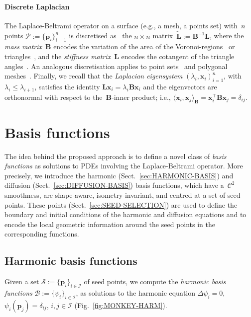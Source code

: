 \documentclass[acmtog,authorversion]{acmart}
\begin{document}
\paragraph*{Discrete Laplacian}
The Laplace-Beltrami operator on a surface (e.g., a mesh, a points set) with~$n$ points \mbox{$\mathcal{P}:=\{\mathbf{p}_{i}\}_{i=1}^{n}$} is discretised as~ the \mbox{$n\times n$} matrix~$\mbox{$\tilde{\mathbf{L}}:=\mathbf{B}^{-1}\mathbf{L}$}$, where the \emph{mass matrix}~$\mathbf{B}$ encodes the variation of the area of the Voronoi-regions~\citep{DESBRUN1999} or triangles~\citep{reuter:cad06}, and the \emph{stiffness matrix}~$\mathbf{L}$ encodes the cotangent of the triangle angles~\citep{PINKALL1993}. An analogous discretisation applies to point sets~\citep{BELKIN2003,LIU2012} and polygonal meshes~\citep{ALEXA2011,HERHOLZ2015}. Finally, we recall that the \emph{Laplacian eigensystem} \mbox{$(\lambda_{i},\mathbf{x}_{i})_{i=1}^{n}$}, with \mbox{$\lambda_{i}\leq\lambda_{i+1}$}, satisfies the identity \mbox{$\mathbf{L}\mathbf{x}_{i}=\lambda_{i}\mathbf{B}\mathbf{x}_{i}$} and the eigenvectors are orthonormal with respect to the~$\mathbf{B}$-inner product; i.e., \mbox{$\langle\mathbf{x}_{i},\mathbf{x}_{j}\rangle_{\mathbf{B}}=\mathbf{x}_{i}^{\top}\mathbf{B}\mathbf{x}_{j}=\delta_{ij}$}.
\newpage

\section{Basis functions\label{sec:SPECTRAL-BASIS}}
The idea behind the proposed approach is to define a novel class of \emph{basis functions} as solutions to PDEs involving the Laplace-Beltrami operator. More precisely, we introduce the harmonic (Sect.~\ref{sec:HARMONIC-BASIS}) and diffusion (Sect.~\ref{sec:DIFFUSION-BASIS}) basis functions, which have a~$\mathcal{C}^{2}$ smoothness, are shape-aware, isometry-invariant, and centred at a set of seed points. These points (Sect.~\ref{sec:SEED-SELECTION}) are used to define the boundary and initial conditions of the harmonic and diffusion equations and to encode the local geometric information around the seed points in the corresponding functions.

\subsection{Harmonic basis functions\label{sec:HARMONIC-BASIS}}
Given a set \mbox{$\mathcal{S}:=\{\mathbf{p}_{i}\}_{i\in\mathcal{I}}$} of seed points, we compute the \emph{harmonic basis functions} \mbox{$\mathcal{B}:=\{\psi_{i}\}_{i\in\mathcal{I}}$}, as solutions to the harmonic equation \mbox{$\Delta\psi_{i}=0$}, \mbox{$\psi_{i}(\mathbf{p}_{j})=\delta_{ij}$}, \mbox{$i,j\in\mathcal{I}$} (Fig.~\ref{fig:MONKEY-HARM}). 
\end{document}
